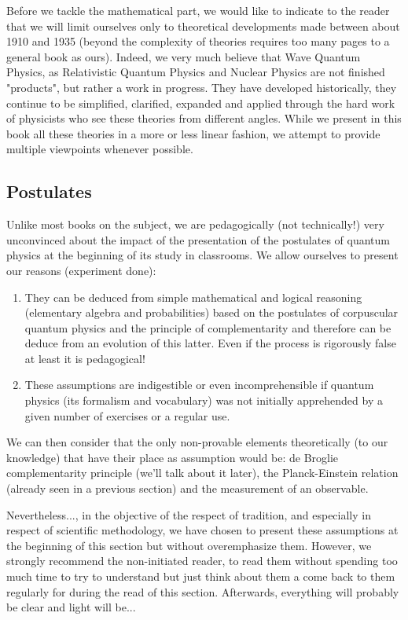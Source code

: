 	Before we tackle the mathematical part, we would like to indicate to the reader that we will limit ourselves only to theoretical developments made between about 1910 and 1935 (beyond the complexity of theories requires too many pages to a general book as ours). Indeed, we very much believe that Wave Quantum Physics, as Relativistic Quantum Physics and Nuclear Physics are not finished "products", but rather a work in progress. They have developed historically, they continue to be simplified, clarified, expanded and applied through the hard work of physicists who see these theories from different angles. While we present in this book all these theories in a more or less linear fashion, we attempt to provide multiple viewpoints whenever possible.
	
	\pagebreak
	\subsection{Postulates}
	Unlike most books on the subject, we are pedagogically (not technically!) very unconvinced about the impact of the presentation of the postulates of quantum physics at the beginning of its study in classrooms. We allow ourselves to present our reasons (experiment done):
	
	\begin{enumerate}
		\item They can be deduced from simple mathematical and logical reasoning (elementary algebra and probabilities) based on the postulates of corpuscular quantum physics and the principle of complementarity and therefore can be deduce from an evolution of this latter. Even if the process is rigorously false at least it is pedagogical!
		\item These assumptions are indigestible or even incomprehensible if quantum physics (its formalism and vocabulary) was not initially apprehended by a given number of exercises or a regular use.
	\end{enumerate}
	We can then consider that the only non-provable elements theoretically (to our knowledge) that have their place as assumption would be: de Broglie complementarity principle (we'll talk about it later), the Planck-Einstein relation (already seen in a previous section) and the measurement of an observable.
	
	Nevertheless..., in the objective of the respect of tradition, and especially in respect of scientific methodology, we have chosen to present these assumptions at the beginning of this section but without overemphasize them. However, we strongly recommend the non-initiated reader, to read them without spending too much time to try to understand but just think about them a come back to them regularly for during the read of this section. Afterwards, everything will probably be clear and light will be...

